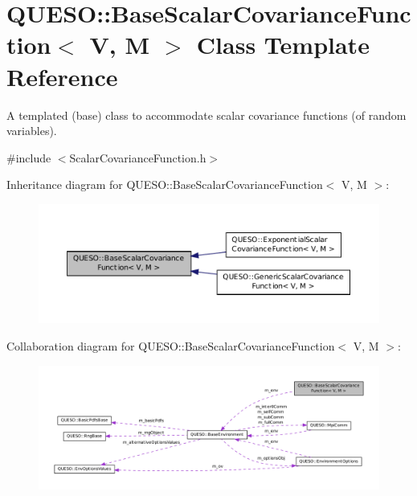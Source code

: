 \hypertarget{class_q_u_e_s_o_1_1_base_scalar_covariance_function}{\section{Q\-U\-E\-S\-O\-:\-:Base\-Scalar\-Covariance\-Function$<$ V, M $>$ Class Template Reference}
\label{class_q_u_e_s_o_1_1_base_scalar_covariance_function}
}


A templated (base) class to accommodate scalar covariance functions (of random variables).  




{\ttfamily \#include $<$Scalar\-Covariance\-Function.\-h$>$}



Inheritance diagram for Q\-U\-E\-S\-O\-:\-:Base\-Scalar\-Covariance\-Function$<$ V, M $>$\-:
\nopagebreak
\begin{figure}[H]
\begin{center}
\leavevmode
\includegraphics[width=350pt]{class_q_u_e_s_o_1_1_base_scalar_covariance_function__inherit__graph}
\end{center}
\end{figure}


Collaboration diagram for Q\-U\-E\-S\-O\-:\-:Base\-Scalar\-Covariance\-Function$<$ V, M $>$\-:
\nopagebreak
\begin{figure}[H]
\begin{center}
\leavevmode
\includegraphics[width=350pt]{class_q_u_e_s_o_1_1_base_scalar_covariance_function__coll__graph}
\end{center}
\end{figure}
